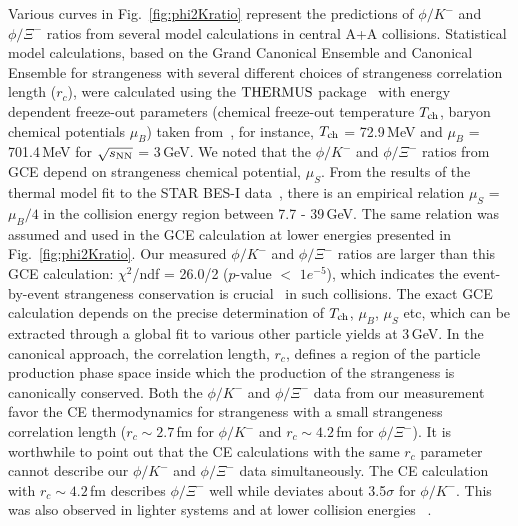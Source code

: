 \documentclass[aps,tightenlines,superscriptaddress,twocolumn]{revtex4-1}
\begin{document}
Various curves in Fig.~\ref{fig:phi2Kratio} represent the predictions of $\phi/K^-$ and $\phi/\Xi^-$ ratios from several model calculations in central A+A collisions. Statistical model calculations, based on the Grand Canonical Ensemble and Canonical Ensemble for strangeness with several different choices of strangeness correlation length ($r_c$), were calculated using the $\textup{THERMUS}$ package~\cite{THERMUS_WHEATON200984} with energy dependent freeze-out parameters (chemical freeze-out temperature $T_{\rm ch}$, baryon chemical potentials $\mu_B$) taken from~\cite{Andronic_2018Naure}, for instance, $T_{\rm ch}$ = 72.9\,MeV and $\mu_B$ = 701.4\,MeV for $\sqrt{s_{\rm NN}}$ = 3\,GeV.
We noted that the $\phi/K^-$ and $\phi/\Xi^-$ ratios from GCE depend on strangeness chemical potential, $\mu_{S}$.
From the results of the thermal model fit to the STAR BES-I data~\cite{star_bes_strangeness:2020}, there is an empirical relation $\mu_{S}$ = $\mu_{B}/4$ in the collision energy region between 7.7 - 39\,GeV. The same relation was assumed and used in the GCE calculation at lower energies presented in Fig.~\ref{fig:phi2Kratio}. 
Our measured $\phi/K^-$ and $\phi/\Xi^-$ ratios are larger than this GCE calculation: $\chi^2$/ndf = 26.0/2 ($p$-value $<$ $1e^{-5}$), 
which indicates the 
event-by-event 
strangeness conservation 
is crucial~\cite{BraunMunzinger:2003zd} in such collisions.
The exact GCE calculation depends on the precise determination of $T_{\rm ch}$, $\mu_B$, $\mu_S$ etc, which can be extracted through a global fit to various other particle yields at 3\,GeV.
In the canonical approach, the correlation length, $r_c$, defines a region of the particle production phase space inside which the production of the strangeness is canonically conserved. Both the $\phi/K^-$ and $\phi/\Xi^-$ data from our measurement favor the CE thermodynamics for strangeness with a small strangeness correlation length ($r_c \sim 2.7$\,fm for $\phi/K^-$ and $r_c \sim 4.2$\,fm for $\phi/\Xi^-$). It is worthwhile to point out that the CE calculations with the same $r_c$ parameter cannot describe our $\phi/K^-$ and $\phi/\Xi^-$ data simultaneously. The CE calculation with $r_c \sim 4.2$\,fm describes $\phi/\Xi^-$ well while deviates about 3.5$\sigma$ for $\phi/K^-$. This was also observed in lighter systems and at lower collision energies ~\cite{HADES_phi_ArKCl:2009,Xi_ArKCl_HADES:2009}.
\end{document}

